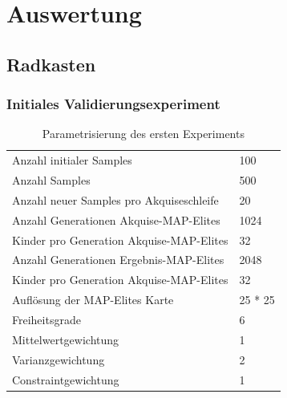 \section{Auswertung}

\subsection{Radkasten}

\subsubsection{Initiales Validierungsexperiment}

\begin{table}[h]
	\centering
	\begin{tabularx}{.75\textwidth}{ll}\hline
		Anzahl initialer Samples & 100 \\
		Anzahl Samples & 500 \\
		Anzahl neuer Samples pro Akquiseschleife & 20 \\
		Anzahl Generationen Akquise-MAP-Elites & 1024 \\
		Kinder pro Generation Akquise-MAP-Elites & 32 \\
		Anzahl Generationen Ergebnis-MAP-Elites & 2048 \\
		Kinder pro Generation Akquise-MAP-Elites & 32 \\
		Auflösung der MAP-Elites Karte & 25 * 25  \\
		\hline
		Freiheitsgrade & 6 \\
		Mittelwertgewichtung & 1 \\
		Varianzgewichtung & 2 \\
		Constraintgewichtung & 1 \\
	\end{tabularx}
	\caption{Parametrisierung des ersten Experiments}
	\label{tab:param1st}
\end{table}

